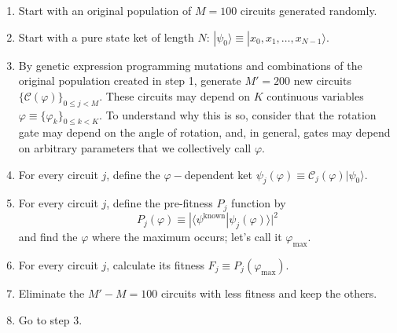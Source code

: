 \documentclass{article}
\begin{document}
\begin{enumerate}
	\item Start with an original population of $M=100$ circuits generated randomly.
	\item Start with a pure state ket of length $N$: $|\psi_0\rangle\equiv|x_0, x_1, \ldots, x_{N-1}\rangle$.
	\item By genetic expression programming mutations and combinations of the original 
	population created in step 1, generate $M'=200$ new circuits
	$\{\mathcal{C}(\varphi)\}_{0\le j<M}$. These circuits may depend on
	$K$ continuous variables
	$\varphi\equiv\{\varphi_k\}_{0\le k<K}$. To understand why this is so, consider that the rotation gate
	may depend on the angle of rotation, and, in general, gates may depend on arbitrary parameters that
	we collectively call $\varphi$.
	\item For every circuit $j$, define the $\varphi-$dependent ket $\psi_j(\varphi)\equiv\mathcal{C}_j(\varphi)|\psi_0\rangle$.
	\item For every circuit $j$, define the pre-fitness $P_j$ function by
	\begin{equation}
		P_j(\varphi) \equiv |\langle \psi^{\textrm{known}} | \psi_j(\varphi)\rangle|^2
	\end{equation}
	and find the $\varphi$ where the maximum occurs; let's call it $\varphi_{\textrm{max}}$.
	\item For every circuit $j$, calculate its fitness $F_j \equiv P_j(\varphi_{\textrm{max}})$.
	\item Eliminate the $M'-M=100$ circuits with less fitness and keep the others.
	\item Go to step 3. 
\end{enumerate}
\end{document}
